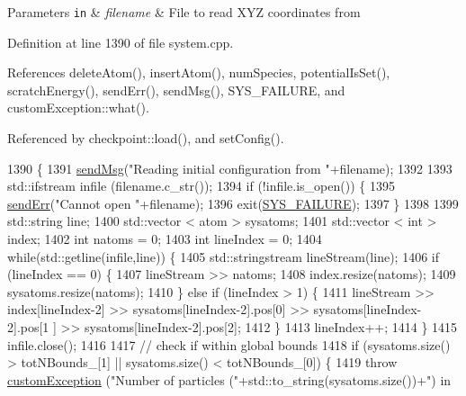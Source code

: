 \begin{DoxyParams}[1]{Parameters}
\mbox{\tt in}  & {\em filename} & File to read X\-Y\-Z coordinates from \\
\hline
\end{DoxyParams}


Definition at line 1390 of file system.\-cpp.



References delete\-Atom(), insert\-Atom(), num\-Species, potential\-Is\-Set(), scratch\-Energy(), send\-Err(), send\-Msg(), S\-Y\-S\-\_\-\-F\-A\-I\-L\-U\-R\-E, and custom\-Exception\-::what().



Referenced by checkpoint\-::load(), and set\-Config().


\begin{DoxyCode}
1390                                               \{
1391     \hyperlink{utilities_8cpp_a08974c73a5b36c28b8ad1ef47fca77b0}{sendMsg}(\textcolor{stringliteral}{"Reading initial configuration from "}+filename);
1392 
1393     std::ifstream infile (filename.c\_str());
1394     \textcolor{keywordflow}{if} (!infile.is\_open()) \{
1395         \hyperlink{utilities_8cpp_a6dacf3c3c19aa1e13a4d5a148fe5114e}{sendErr}(\textcolor{stringliteral}{"Cannot open "}+filename);
1396         exit(\hyperlink{global_8h_a428dfe1ef0a6ff4b1fdebf275f6aff2e}{SYS\_FAILURE});
1397     \}
1398 
1399     std::string line;
1400     std::vector < atom > sysatoms;
1401     std::vector < int > index;
1402     \textcolor{keywordtype}{int} natoms = 0;
1403     \textcolor{keywordtype}{int} lineIndex = 0;
1404     \textcolor{keywordflow}{while}(std::getline(infile,line)) \{
1405         std::stringstream lineStream(line);
1406         \textcolor{keywordflow}{if} (lineIndex == 0) \{
1407             lineStream >> natoms;
1408             index.resize(natoms);
1409             sysatoms.resize(natoms);
1410         \} \textcolor{keywordflow}{else} \textcolor{keywordflow}{if} (lineIndex > 1) \{
1411             lineStream >> index[lineIndex-2] >> sysatoms[lineIndex-2].pos[0] >> sysatoms[lineIndex-2].pos[1
      ] >> sysatoms[lineIndex-2].pos[2];
1412         \}
1413         lineIndex++;
1414     \}
1415     infile.close();
1416 
1417     \textcolor{comment}{// check if within global bounds}
1418     \textcolor{keywordflow}{if} (sysatoms.size() > totNBounds\_[1] || sysatoms.size() < totNBounds\_[0]) \{
1419         \textcolor{keywordflow}{throw} \hyperlink{classcustom_exception}{customException} (\textcolor{stringliteral}{"Number of particles ("}+std::to\_string(sysatoms.size())+\textcolor{stringliteral}{") in
}
\end{DoxyCode}
